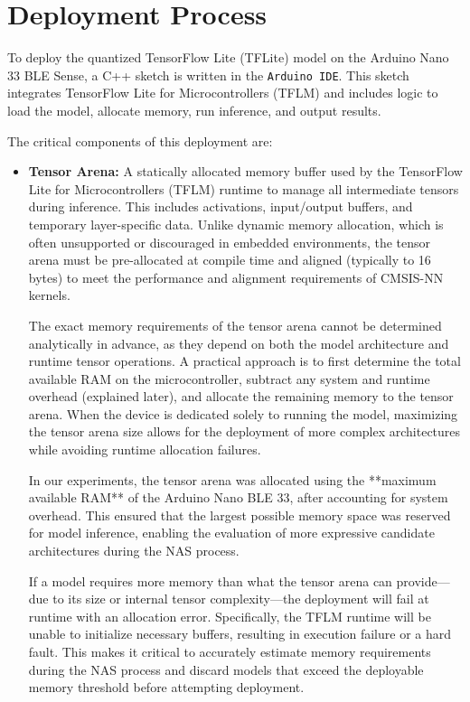 \section{Deployment Process}
\label{sec:DeploymentProcess}
To deploy the quantized TensorFlow Lite (TFLite) model on the Arduino Nano 33 BLE Sense, a C++ sketch is written in the \texttt{Arduino IDE}. This sketch integrates TensorFlow Lite for Microcontrollers (TFLM) and includes logic to load the model, allocate memory, run inference, and output results. 

The critical components of this deployment are:

\begin{itemize}
    \item \textbf{Tensor Arena:}  
    A statically allocated memory buffer used by the TensorFlow Lite for Microcontrollers (TFLM) runtime to manage all intermediate tensors during inference. This includes activations, input/output buffers, and temporary layer-specific data. Unlike dynamic memory allocation, which is often unsupported or discouraged in embedded environments, the tensor arena must be pre-allocated at compile time and aligned (typically to 16 bytes) to meet the performance and alignment requirements of CMSIS-NN kernels.
    
    The exact memory requirements of the tensor arena cannot be determined analytically in advance, as they depend on both the model architecture and runtime tensor operations. A practical approach is to first determine the total available RAM on the microcontroller, subtract any system and runtime overhead (explained later), and allocate the remaining memory to the tensor arena. When the device is dedicated solely to running the model, maximizing the tensor arena size allows for the deployment of more complex architectures while avoiding runtime allocation failures.
    
    In our experiments, the tensor arena was allocated using the **maximum available RAM** of the Arduino Nano BLE 33, after accounting for system overhead. This ensured that the largest possible memory space was reserved for model inference, enabling the evaluation of more expressive candidate architectures during the NAS process.

    If a model requires more memory than what the tensor arena can provide—due to its size or internal tensor complexity—the deployment will fail at runtime with an allocation error. Specifically, the TFLM runtime will be unable to initialize necessary buffers, resulting in execution failure or a hard fault. This makes it critical to accurately estimate memory requirements during the NAS process and discard models that exceed the deployable memory threshold before attempting deployment.
    


\end{itemize}
